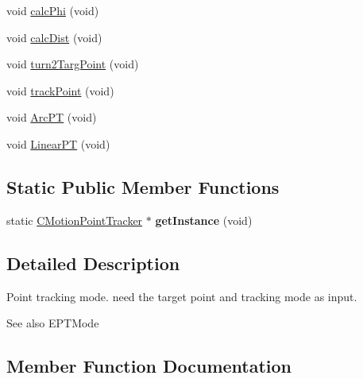 \begin{DoxyCompactItemize}
\item 
void \mbox{\hyperlink{classmotion_1_1CMotionPointTracker_ab8567bd6ad6c796d47e72cb633ee93d3}{calc\+Phi}} (void)
\item 
void \mbox{\hyperlink{classmotion_1_1CMotionPointTracker_abeaaec052308d9f7cab9d1fbb8db90c3}{calc\+Dist}} (void)
\item 
void \mbox{\hyperlink{classmotion_1_1CMotionPointTracker_a587b38d9065c24f76005adde9a21fb75}{turn2\+Targ\+Point}} (void)
\item 
void \mbox{\hyperlink{classmotion_1_1CMotionPointTracker_abde667e158fa615c6e761ac3167c9359}{track\+Point}} (void)
\item 
void \mbox{\hyperlink{classmotion_1_1CMotionPointTracker_a93fee9fef4b855533249ba19e428c306}{Arc\+PT}} (void)
\item 
void \mbox{\hyperlink{classmotion_1_1CMotionPointTracker_a79e987afad15936fb09e7e2705aff01e}{Linear\+PT}} (void)
\end{DoxyCompactItemize}
\subsection*{Static Public Member Functions}
\begin{DoxyCompactItemize}
\item 
\mbox{\label{classmotion_1_1CMotionPointTracker_aaf797081d88b83b3af9acd23143fa7f5}} 
static \mbox{\hyperlink{classmotion_1_1CMotionPointTracker}{C\+Motion\+Point\+Tracker}} $\ast$ {\bfseries get\+Instance} (void)
\end{DoxyCompactItemize}


\subsection{Detailed Description}
Point tracking mode. need the target point and tracking mode as input. \begin{DoxySeeAlso}{See also}
E\+P\+T\+Mode 
\end{DoxySeeAlso}


\subsection{Member Function Documentation}
\mbox{\label{classmotion_1_1CMotionPointTracker_a93fee9fef4b855533249ba19e428c306}} 
